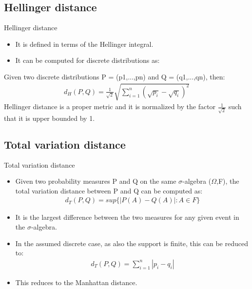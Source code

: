 \documentclass{beamer}
\begin{document}
\subsection{Hellinger distance}
\begin{frame}{Hellinger distance}
    \begin{itemize}
        \item It is defined in terms of the Hellinger integral.
        \item It can be computed for discrete distributions as:
    \end{itemize}
    Given two discrete distributions P = (p1,...,pn) and Q = (q1,...,qn), then:
    \begin{align}
        d_H(P, Q) = \frac{1}{\sqrt{2}}\sqrt{\sum_{i=1} ^ n (\sqrt{p_i} - \sqrt{q_i})^2}
    \end{align}
    Hellinger distance is a proper metric and it is normalized by the factor $\frac{1}{\sqrt{2}}$ such that it is upper bounded by 1.
\end{frame}
\subsection{Total variation distance}
\begin{frame}{Total variation distance}
    \begin{itemize}
    \item Given two probability measures P and Q on the same $\sigma$-algebra ($\Omega$,F), the total variation distance between P and Q can be computed as:
    \begin{align}
        d_T(P,Q) = sup\{|P(A) - Q(A)|: A \in F\}
    \end{align}
    \item It is the largest difference between the two measures for any given event in the $\sigma$-algebra.
    \item In the assumed discrete case, as also the support is finite, this can be reduced to:
    \begin{align}
        d_T(P,Q) = \sum_{i=1} ^ n |p_i - q_i|
    \end{align}
    \item This reduces to the Manhattan distance.
    \end{itemize}
\end{frame}
\end{document}
